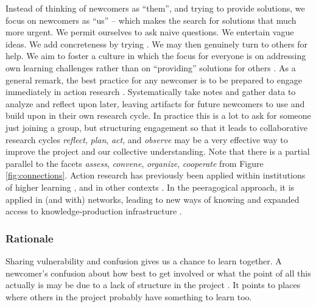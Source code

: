Instead of thinking of newcomers as ``them'', and trying to provide
solutions, we focus on newcomers as ``us'' -- which makes the search
for solutions that much more urgent.  We permit ourselves to ask naive
questions.  We entertain vague ideas.  We add concreteness by trying
.  We may then genuinely turn to
others for help.
We aim to foster a culture in which the focus for everyone is on
addressing own learning challenges rather than on ``providing''
solutions for others \cite{boud2005peer}.
%
As a general remark, the best practice for any newcomer is to be
prepared to engage immediately in action research
\cite{lewin1946action}.  Systematically take notes and gather data to
analyze and reflect upon later, leaving artifacts for future newcomers
to use and build upon in their own research cycle.  In practice this is a
lot to ask for someone just joining a group, but structuring
engagement so that it leads to collaborative research cycles
\emph{reflect}, \emph{plan}, \emph{act}, and \emph{observe} may be a
very effective way to improve the project and our collective
understanding.
Note that there is a partial parallel to the facets \emph{assess},
\emph{convene}, \emph{organize}, \emph{cooperate} from Figure
\ref{fig:connections}.  Action research has previously been applied
within institutions of higher learning \cite{action-research-OU}, and
in other contexts \cite{trist1951some,bergold2012participatory}.
%
In the peeragogical approach, it is applied in (and with) networks,
leading to new ways of knowing and expanded access to
knowledge-production infrastructure \cite{gilbert2012being,wagner2008new}.


%
\subsubsection*{Rationale} 
%
Sharing vulnerability and confusion gives us a chance to learn
together.  A newcomer's confusion about how best to get involved or
what the point of all this actually is may be due to a lack of
structure in the project .  It points to places
where others in the project probably have something to learn too.
%

